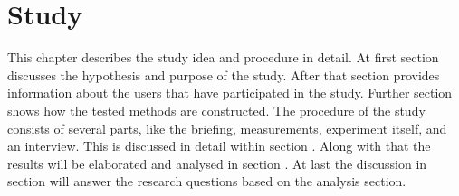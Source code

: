 \chapter{Study}
This chapter describes the study idea and procedure in detail. At first section  discusses the hypothesis and purpose of the study. After that section  provides information about the users that have participated in the study. Further section  shows how the tested methods are constructed. The procedure of the study consists of several parts, like the briefing, measurements, experiment itself, and an interview. This is discussed in detail within section . Along with that the results will be elaborated and analysed in section . At last the discussion in section  will answer the research questions based on the analysis section.







